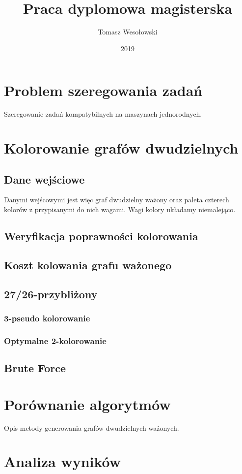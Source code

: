 \documentclass{article}
\title{Praca dyplomowa magisterska}
\author{Tomasz Wesołowski}
\date{2019}
\begin{document}
 
\maketitle
 
\tableofcontents
 
\section{Problem szeregowania zadań}

Szeregowanie zadań kompatybilnych na maszynach jednorodnych.

\section{Kolorowanie grafów dwudzielnych}

\subsection*{Dane wejściowe}

Danymi wejścowymi jest więc graf dwudzielny ważony oraz paleta czterech kolorów z przypisanymi do nich wagami. Wagi kolory układamy niemalejąco.

\subsection*{Weryfikacja poprawności kolorowania}



\subsection*{Koszt kolowania grafu ważonego}



\subsection{27/26-przybliżony}



\subsubsection*{3-pseudo kolorowanie}



\subsubsection*{Optymalne 2-kolorowanie}



\subsection{Brute Force}

\section{Porównanie algorytmów}

Opis metody generowania grafów dwudzielnych ważonych.

\section{Analiza wyników}
 
\end{document}

